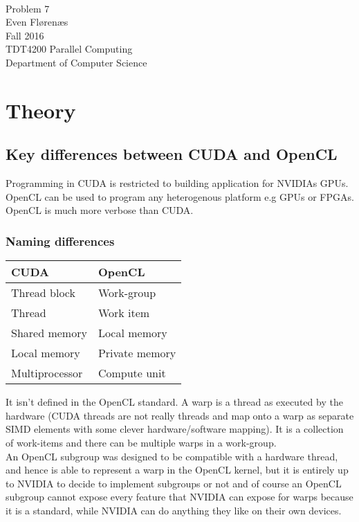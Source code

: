 \documentclass[12pt]{article}
\begin{document}
\thispagestyle{empty}
\mbox{}\\[6pc]
\begin{center}
\Huge{Problem 7}\\[2pc]

\Large{Even Flørenæs}\\[1pc]
\Large{Fall 2016}\\[2pc]

TDT4200 Parallel Computing\\
Department of Computer Science
\end{center}
\vfill

\newpage
\tableofcontents
\newpage
\section{Theory}
\subsection{Key differences between CUDA and OpenCL}
Programming in CUDA is restricted to building application for NVIDIAs GPUs. OpenCL can be used to program any heterogenous platform e.g GPUs or FPGAs. OpenCL is much more verbose than CUDA.
\subsubsection{Naming differences}

\begin{center}
\begin{tabular}{| l | l |}
	\hline
	\textbf{CUDA} & \textbf{OpenCL} \\ \hline
	Thread block & Work-group \\ \hline
	Thread & Work item \\ \hline
	Shared memory & Local memory \\ \hline
	Local memory &  Private memory\\ \hline
	Multiprocessor & Compute unit \\ \hline
\end{tabular}
\end{center}
It isn't defined in the OpenCL standard. A warp is a thread as executed by the hardware (CUDA threads are not really threads and map onto a warp as separate SIMD elements with some clever hardware/software mapping). It is a collection of work-items and there can be multiple warps in a work-group.
\\[10pt]
An OpenCL subgroup was designed to be compatible with a hardware thread, and hence is able to represent a warp in the OpenCL kernel, but it is entirely up to NVIDIA to decide to implement subgroups or not and of course an OpenCL subgroup cannot expose every feature that NVIDIA can expose for warps because it is a standard, while NVIDIA can do anything they like on their own devices.
\end{document}
